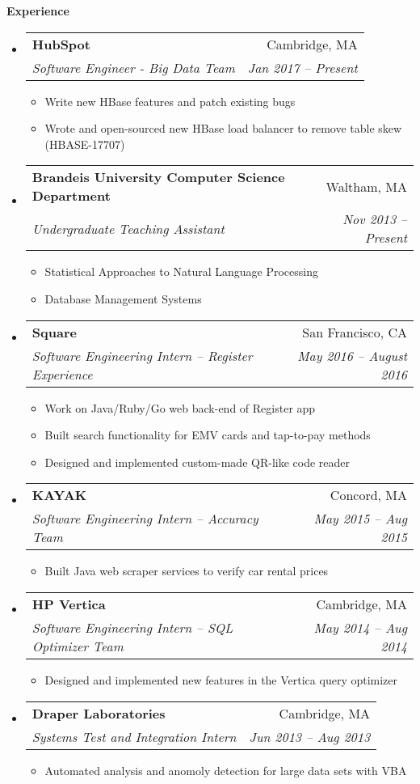 \documentclass[letterpaper,11pt]{article}
\makeatletter
\newcommand{\resitem}[1]{\item #1 \vspace{-2pt}}
\newcommand{\resheading}[1]{{\large \colorbox{mygrey}{\begin{minipage}{\textwidth}{\textbf{#1 \vphantom{p\^{E}}}}\end{minipage}}}}
\newcommand{\ressubheading}[4]{
\begin{tabular*}{6.5in}{l@{\extracolsep{\fill}}r}
		\textbf{#1} & #2 \\
		\textit{#3} & \textit{#4} \\
\end{tabular*}\vspace{-6pt}}
\makeatother
\begin{document}
\resheading{Experience}
	\begin{itemize}
	
	    \item
            \ressubheading{HubSpot}{Cambridge, MA}
			{Software Engineer - Big Data Team}{Jan 2017 -- Present}
			{\footnotesize
			\begin{itemize}
                \resitem{Write new HBase features and patch existing bugs}
                \resitem{Wrote and open-sourced new HBase load balancer to remove table skew (HBASE-17707)}
			\end{itemize}
			}
	    \item
            \ressubheading{Brandeis University Computer Science Department}{Waltham, MA}
			{Undergraduate Teaching Assistant}{Nov 2013 -- Present}
			{\footnotesize
			\begin{itemize}
                \resitem{Statistical Approaches to Natural Language Processing}
                \resitem{Database Management Systems}
			\end{itemize}
			}

		\item
            \ressubheading{Square}{San Francisco, CA}
            {Software Engineering Intern -- Register Experience}{May 2016 -- August 2016}
            {\footnotesize
            \begin{itemize}
                \resitem{Work on Java/Ruby/Go web back-end of Register app}
                \resitem{Built search functionality for EMV cards and tap-to-pay methods}
                \resitem{Designed and implemented custom-made QR-like code reader}
            \end{itemize}
            }

	    \item
            \ressubheading{KAYAK}{Concord, MA}
            {Software Engineering Intern -- Accuracy Team}{May 2015 -- Aug 2015}
            {\footnotesize
            \begin{itemize}
                \resitem{Built Java web scraper services to verify car rental prices}
            \end{itemize}
            }

		\item
			\ressubheading{HP Vertica}{Cambridge, MA}
			{Software Engineering Intern -- SQL Optimizer Team}{May 2014 -- Aug 2014}
			{ \footnotesize
			\begin{itemize}
				\resitem{Designed and implemented new features in the Vertica query optimizer}
			\end{itemize}
			}
		\item
			\ressubheading{Draper Laboratories}{Cambridge, MA}
			    {Systems Test and Integration Intern}{Jun 2013 -- Aug 2013}
				{ \footnotesize
				\begin{itemize}
					\resitem{Automated analysis and anomoly detection for large data sets with VBA}
				\end{itemize}
				}

	\end{itemize}  %
\end{document}
